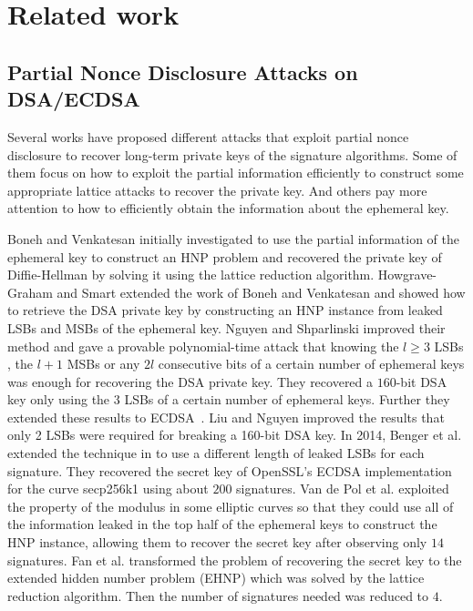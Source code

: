 \section{Related work}
\label{sec:relatedwork}
\subsection{Partial Nonce Disclosure Attacks on DSA/ECDSA}
Several works have proposed different attacks that exploit partial nonce disclosure to recover long-term private keys of the signature algorithms.
Some of them focus on how to exploit the partial information efficiently to construct some appropriate lattice attacks to recover the private key.
 And others pay more attention to how to efficiently obtain the information about the ephemeral key.

Boneh and Venkatesan \cite{boneh1996} initially investigated to use the partial information of the ephemeral key to construct an HNP problem and recovered the private key of Diffie-Hellman by solving it using the lattice reduction algorithm.
Howgrave-Graham and Smart \cite{HG2001} extended the work of Boneh and Venkatesan \cite{boneh1996} and  showed how to retrieve the DSA private key by  constructing an HNP instance from leaked LSBs and MSBs of the ephemeral key.
Nguyen and Shparlinski \cite{Nguyen2002} improved their method  and gave a provable polynomial-time attack that
      knowing the $l \geq 3$ LSBs , the $l+1$ MSBs  or any $2l$ consecutive bits of a certain number of ephemeral keys was enough for recovering the DSA private key.
 They recovered  a $160$-bit DSA key only using the $3$ LSBs of a certain number of ephemeral keys.
 Further they extended these results to ECDSA~\cite{Nguyen2003}.
Liu and Nguyen \cite{Liu2013} improved the results that only 2 LSBs were required for breaking a 160-bit DSA key.
In 2014, Benger et al. \cite{Benger2014} extended the technique in \cite{Nguyen2002} to use a different length of leaked LSBs for each signature.
 They recovered the secret key of OpenSSL's ECDSA implementation for the curve secp256k1 using about $200$ signatures.
Van de Pol et al. \cite{Van2015} exploited the property of the modulus in some elliptic curves so that they could use all of the information leaked in the top half of the ephemeral keys to construct the HNP instance, allowing them to recover the secret key after observing only $14$ signatures.
Fan et al. \cite{Fan2016} transformed the problem of recovering the secret key to the extended hidden number problem (EHNP)
  which was solved by the lattice reduction algorithm.
   Then the number of signatures needed was reduced to $4$.
   

